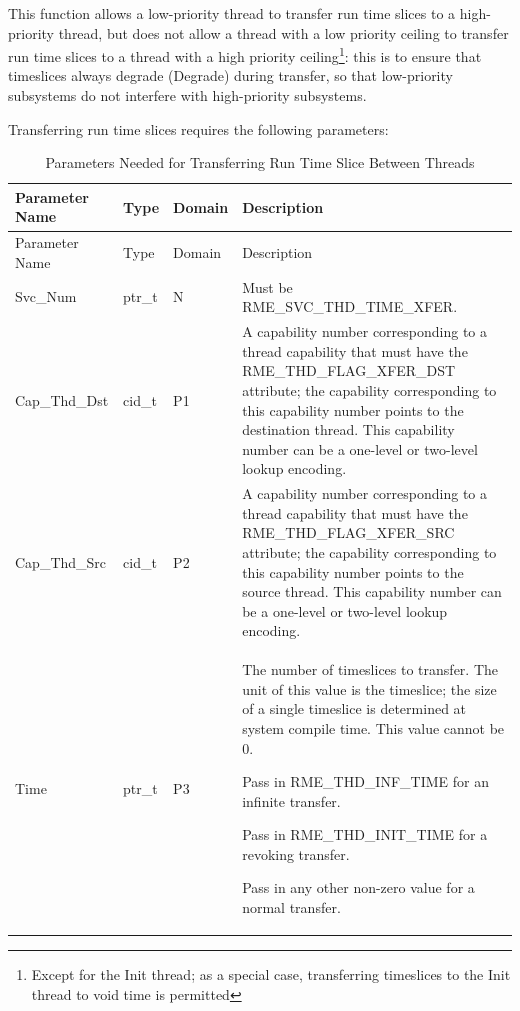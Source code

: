 This function allows a low-priority thread to transfer run time slices to a high-priority thread, but does not allow a thread with a low priority ceiling to transfer run time slices to a thread with a high priority ceiling\footnote{Except for the Init thread; as a special case, transferring timeslices to the Init thread to void time is permitted}: this is to ensure that timeslices always degrade (Degrade) during transfer, so that low-priority subsystems do not interfere with high-priority subsystems.

Transferring run time slices requires the following parameters:

\begin{xltabular}{\textwidth}{@{}>{\hsize\raggedright\arraybackslash}X>{\hsize\raggedright\arraybackslash}X>{\hsize\raggedright\arraybackslash}X>{\hsize\raggedright\arraybackslash}X@{}}
\caption{Parameters Needed for Transferring Run Time Slice Between Threads}\label{tab:4-34-transfer-run-time-slice-between-threads-parameters}\\
\toprule
Parameter Name & Type & Domain & Description\tabularnewline
\endfirsthead
\toprule
Parameter Name & Type & Domain & Description\tabularnewline
\midrule
\endhead
\bottomrule
\endlastfoot
Svc\_Num & ptr\_t & N & Must be RME\_SVC\_THD\_TIME\_XFER.\tabularnewline
Cap\_Thd\_Dst & cid\_t & P1 &
A capability number corresponding to a thread capability that must have the RME\_THD\_FLAG\_XFER\_DST attribute; the capability corresponding to this capability number points to the destination thread. This capability number can be a one-level or two-level lookup encoding.\tabularnewline
Cap\_Thd\_Src & cid\_t & P2 &
A capability number corresponding to a thread capability that must have the RME\_THD\_FLAG\_XFER\_SRC attribute; the capability corresponding to this capability number points to the source thread. This capability number can be a one-level or two-level lookup encoding.\tabularnewline
Time\strut
 & ptr\_t\strut
 & P3\strut
 & The number of timeslices to transfer. The unit of this value is the timeslice; the size of a single timeslice is determined at system compile time. This value cannot be 0.

Pass in RME\_THD\_INF\_TIME for an infinite transfer.

Pass in RME\_THD\_INIT\_TIME for a revoking transfer.

Pass in any other non-zero value for a normal transfer.\strut
\tabularnewline
\end{xltabular}
\nopagebreak[4]

